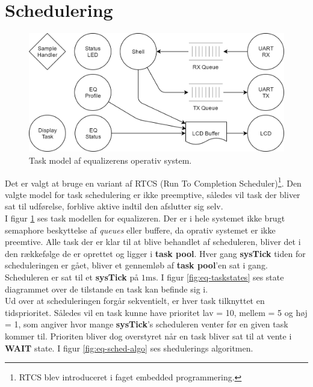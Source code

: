 \section{Schedulering}

\begin{figure}[h!]
	\centering
	\includegraphics[width=.7\textwidth]{billeder/eq-one.png}
	\caption{Task model af equalizerens operativ system.}
	\label{fig:eq-taskmodel}
\end{figure}

Det er valgt at bruge en variant af RTCS (Run To Completion Scheduler)\footnote{RTCS blev introduceret i faget embedded programmering.}. 
Den valgte model for task schedulering er ikke preemptive, således vil task der bliver sat til udførelse, forblive aktive indtil den afslutter sig selv. \\

I figur \ref{fig:eq-taskmodel} ses task modellen for equalizeren. 
Der er i hele systemet ikke brugt semaphore beskyttelse af \textit{queues} eller buffere, da oprativ systemet er ikke preemtive.
Alle task der er klar til at blive behandlet af scheduleren, bliver det i den rækkefølge de er oprettet og ligger i \textbf{task pool}. Hver gang \textbf{sysTick} tiden for scheduleringen er gået, bliver et gennemløb af \textbf{task pool}'en sat i gang. Scheduleren er sat til et \textbf{sysTick} på $1\si{\milli\second}$.
I figur \ref{fig:eq-taskstates} ses state diagrammet over de tilstande en task kan befinde sig i.\\

Ud over at scheduleringen forgår sekventielt, er hver task tilknyttet en tidsprioritet. 
Således vil en task kunne have prioritet lav = 10, mellem = 5 og høj = 1, som angiver hvor mange \textbf{sysTick}'s scheduleren venter før en given task kommer til.
Prioriten bliver dog overstyret når en task bliver sat til at vente i \textbf{WAIT} state. 
I figur \ref{fig:eq-sched-algo} ses shedulerings algoritmen.

